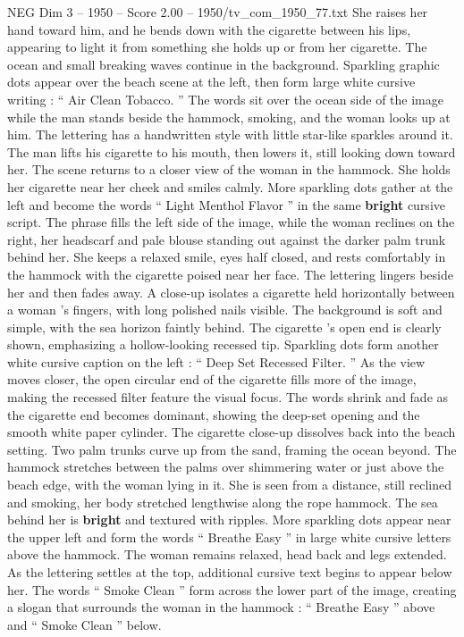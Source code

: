 \begin{textsample}{NEG Dim 3 – 1950 – Score 2.00 – 1950/tv\_com\_1950\_77.txt}
She raises her hand toward him, and he bends down with the cigarette between his lips, appearing to light it from something she holds up or from her cigarette.
The ocean and small breaking waves continue in the background.
Sparkling graphic dots appear over the beach scene at the left, then form large white cursive writing : “ Air Clean Tobacco. ” The words sit over the ocean side of the image while the man stands beside the hammock, smoking, and the woman looks up at him.
The lettering has a handwritten style with little star-like sparkles around it.
The man lifts his cigarette to his mouth, then lowers it, still looking down toward her.
The scene returns to a closer view of the woman in the hammock.
She holds her cigarette near her cheek and smiles calmly.
More sparkling dots gather at the left and become the words “ Light Menthol Flavor ” in the same \textbf{bright} cursive script.
The phrase fills the left side of the image, while the woman reclines on the right, her headscarf and pale blouse standing out against the darker palm trunk behind her.
She keeps a relaxed smile, eyes half closed, and rests comfortably in the hammock with the cigarette poised near her face.
The lettering lingers beside her and then fades away.
A close-up isolates a cigarette held horizontally between a woman ’s fingers, with long polished nails visible.
The background is soft and simple, with the sea horizon faintly behind.
The cigarette ’s open end is clearly shown, emphasizing a hollow-looking recessed tip.
Sparkling dots form another white cursive caption on the left : “ Deep Set Recessed Filter. ” As the view moves closer, the open circular end of the cigarette fills more of the image, making the recessed filter feature the visual focus.
The words shrink and fade as the cigarette end becomes dominant, showing the deep-set opening and the smooth white paper cylinder.
The cigarette close-up dissolves back into the beach setting.
Two palm trunks curve up from the sand, framing the ocean beyond.
The hammock stretches between the palms over shimmering water or just above the beach edge, with the woman lying in it.
She is seen from a distance, still reclined and smoking, her body stretched lengthwise along the rope hammock.
The sea behind her is \textbf{bright} and textured with ripples.
More sparkling dots appear near the upper left and form the words “ Breathe Easy ” in large white cursive letters above the hammock.
The woman remains relaxed, head back and legs extended.
As the lettering settles at the top, additional cursive text begins to appear below her.
The words “ Smoke Clean ” form across the lower part of the image, creating a slogan that surrounds the woman in the hammock : “ Breathe Easy ” above and “ Smoke Clean ” below.

\end{textsample}
